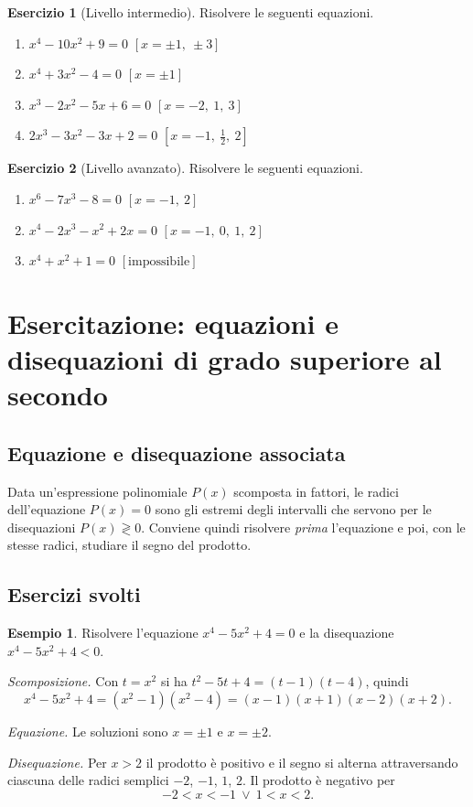 \documentclass[12pt,a4paper,openany]{book}
\theoremstyle{definition}
\newtheorem{esempio}{Esempio}[section]
\newtheorem{esercizio}{Esercizio}[section]
\theoremstyle{plain}
\theoremstyle{remark}
\begin{document}
\begin{esercizio}[Livello intermedio]
Risolvere le seguenti equazioni.
\begin{enumerate}[label=\alph*)]
\item $x^4-10x^2+9=0$ \hfill $[x=\pm 1,\ \pm 3]$
\item $x^4+3x^2-4=0$ \hfill $[x=\pm 1]$
\item $x^3-2x^2-5x+6=0$ \hfill $[x=-2,\ 1,\ 3]$
\item $2x^3-3x^2-3x+2=0$ \hfill $[x=-1,\ \tfrac12,\ 2]$
\end{enumerate}
\end{esercizio}

\begin{esercizio}[Livello avanzato]
Risolvere le seguenti equazioni.
\begin{enumerate}[label=\alph*)]
\item $x^6-7x^3-8=0$ \hfill $[x=-1,\ 2]$
\item $x^4-2x^3-x^2+2x=0$ \hfill $[x=-1,\ 0,\ 1,\ 2]$
\item $x^4+x^2+1=0$ \hfill $[\text{impossibile}]$
\end{enumerate}
\end{esercizio}

\section{Esercitazione: equazioni e disequazioni di grado superiore al secondo}

\subsection*{Equazione e disequazione associata}

Data un'espressione polinomiale $P(x)$ scomposta in fattori, le radici dell'equazione $P(x)=0$ sono gli estremi degli intervalli che servono per le disequazioni $P(x)\gtrless 0$. Conviene quindi risolvere \emph{prima} l'equazione e poi, con le stesse radici, studiare il segno del prodotto.

\subsection*{Esercizi svolti}

\begin{esempio}
Risolvere l'equazione $x^4-5x^2+4=0$ e la disequazione $x^4-5x^2+4<0$.

\emph{Scomposizione.} Con $t=x^2$ si ha $t^2-5t+4=(t-1)(t-4)$, quindi
\[
x^4-5x^2+4=(x^2-1)(x^2-4)=(x-1)(x+1)(x-2)(x+2).
\]

\emph{Equazione.} Le soluzioni sono $x=\pm 1$ e $x=\pm 2$.

\emph{Disequazione.} Per $x>2$ il prodotto è positivo e il segno si alterna attraversando ciascuna delle radici semplici $-2$, $-1$, $1$, $2$. Il prodotto è negativo per
\[
-2<x<-1\ \lor\ 1<x<2.
\]
\end{esempio}
\end{document}
